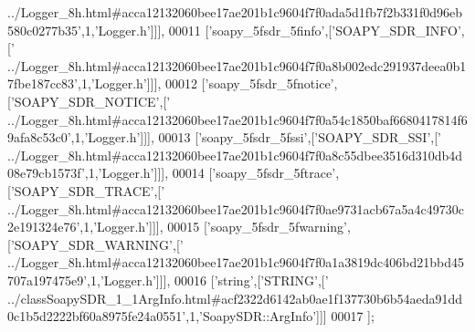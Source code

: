 \begin{DoxyCode}
{      ../Logger\_8h.html#acca12132060bee17ae201b1c9604f7f0ada5d1fb7f2b331f0d96eb580c0277b35'},1,\textcolor{stringliteral}{'Logger.h'}]]],
00011   [\textcolor{stringliteral}{'soapy\_5fsdr\_5finfo'},[\textcolor{stringliteral}{'SOAPY\_SDR\_INFO'},[\textcolor{stringliteral}{'
      ../Logger\_8h.html#acca12132060bee17ae201b1c9604f7f0a8b002edc291937deea0b17fbe187cc83'},1,\textcolor{stringliteral}{'Logger.h'}]]],
00012   [\textcolor{stringliteral}{'soapy\_5fsdr\_5fnotice'},[\textcolor{stringliteral}{'SOAPY\_SDR\_NOTICE'},[\textcolor{stringliteral}{'
      ../Logger\_8h.html#acca12132060bee17ae201b1c9604f7f0a54c1850baf6680417814f69afa8c53c0'},1,\textcolor{stringliteral}{'Logger.h'}]]],
00013   [\textcolor{stringliteral}{'soapy\_5fsdr\_5fssi'},[\textcolor{stringliteral}{'SOAPY\_SDR\_SSI'},[\textcolor{stringliteral}{'
      ../Logger\_8h.html#acca12132060bee17ae201b1c9604f7f0a8c55dbee3516d310db4d08e79cb1573f'},1,\textcolor{stringliteral}{'Logger.h'}]]],
00014   [\textcolor{stringliteral}{'soapy\_5fsdr\_5ftrace'},[\textcolor{stringliteral}{'SOAPY\_SDR\_TRACE'},[\textcolor{stringliteral}{'
      ../Logger\_8h.html#acca12132060bee17ae201b1c9604f7f0ae9731acb67a5a4c49730c2e191324e76'},1,\textcolor{stringliteral}{'Logger.h'}]]],
00015   [\textcolor{stringliteral}{'soapy\_5fsdr\_5fwarning'},[\textcolor{stringliteral}{'SOAPY\_SDR\_WARNING'},[\textcolor{stringliteral}{'
      ../Logger\_8h.html#acca12132060bee17ae201b1c9604f7f0a1a3819dc406bd21bbd45707a197475e9'},1,\textcolor{stringliteral}{'Logger.h'}]]],
00016   [\textcolor{stringliteral}{'string'},[\textcolor{stringliteral}{'STRING'},[\textcolor{stringliteral}{'
      ../classSoapySDR\_1\_1ArgInfo.html#acf2322d6142ab0ae1f137730b6b54aeda91dd0c1b5d2222bf60a8975fe24a0551'},1,\textcolor{stringliteral}{'SoapySDR::ArgInfo'}]]]
00017 ];
\end{DoxyCode}
